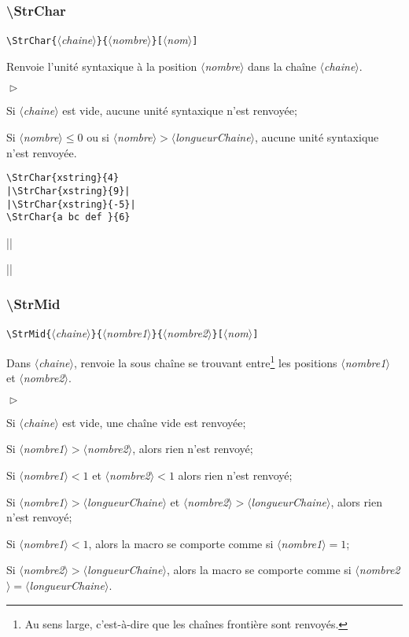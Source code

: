 \documentclass[a4paper,10pt]{article}
\newcommand\guill[1]{\og{}#1\fg{}}
\newcommand\argu[1]{$\langle$\textit{#1}$\rangle$}
\newcommand\ARGU[1]{\texttt{\color{black}\{}\argu{#1}\texttt{\color{black}\}}}
\newcommand\arguC[1]{\texttt{\color{black}[}\argu{#1}\texttt{\color{black}]}}
\newenvironment{Conditions}[1][1cm]%
{\begin{list}%
	{$\vartriangleright$}%
	{\setlength{\leftmargin}{#1}
	 \setlength{\itemsep}{0pt}
	 \setlength{\parsep}{0pt}
	 \setlength{\topsep}{2ptplus3ptminus2pt}
	}}%
{\end{list}}
\newcommand\US{unité syntaxique\xspace}
\newcommand\styleexemple{\small\vskip4pt}
\newcommand\verbinline{\lstinline[basicstyle=\normalsize\ttfamily]}
\begin{document}
\subsubsection{\ttfamily\textbackslash StrChar}
\verbinline|\StrChar|\ARGU{chaine}\ARGU{nombre}\arguC{nom}
\smallskip

Renvoie l'\US à la position \argu{nombre} dans la chaîne \argu{chaine}.\medskip

\begin{Conditions}
	\item Si \argu{chaine} est vide, aucune \US n'est renvoyée;
	\item Si \argu{nombre}${}\leqslant0$ ou si \argu{nombre}${}>{}$\argu{longueurChaine}, aucune \US n'est renvoyée.
\end{Conditions}

\begin{minipage}[t]{0.65\linewidth}
\begin{lstlisting}
\StrChar{xstring}{4}
|\StrChar{xstring}{9}|
|\StrChar{xstring}{-5}|
\StrChar{a bc def }{6}
\end{lstlisting}%
\end{minipage}\hfill
\begin{minipage}[t]{0.35\linewidth}
	\styleexemple
	\par
	||\par
	||\par
\end{minipage}%

\subsubsection{\ttfamily\textbackslash StrMid}
\verbinline|\StrMid|\ARGU{chaine}\ARGU{nombre1}\ARGU{nombre2}\arguC{nom}
\smallskip

Dans \argu{chaine}, renvoie la sous chaîne se trouvant entre\footnote{Au sens large, c'est-à-dire que les chaînes \guill{frontière} sont renvoyés.} les positions \argu{nombre1} et \argu{nombre2}.\medskip

\begin{Conditions}
	\item Si \argu{chaine} est vide, une chaîne vide est renvoyée;
	\item Si \argu{nombre1}${}>{}$\argu{nombre2}, alors rien n'est renvoyé;
	\item Si \argu{nombre1}${}<1$ et \argu{nombre2}${}<1$ alors rien n'est renvoyé;
	\item Si \argu{nombre1}${}>{}$\argu{longueurChaine} et \argu{nombre2}${}>{}$\argu{longueurChaine}, alors rien n'est renvoyé;
	\item Si \argu{nombre1}${}<1$, alors la macro se comporte comme si \argu{nombre1}${}=1$;
	\item Si \argu{nombre2}${}>{}$\argu{longueurChaine}, alors la macro se comporte comme si \argu{nombre2}${}={}$\argu{longueurChaine}.
\end{Conditions}
\end{document}
